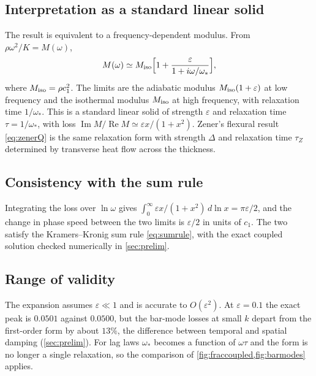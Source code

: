 \subsection{Interpretation as a standard linear solid}
The result is equivalent to a frequency-dependent modulus. From $\rho\omega^2/K=M(\omega)$,
\begin{equation}
M(\omega)\simeq M_{\rm iso}\Bigl[1+\frac{\varepsilon}{1+i\omega/\omega_*}\Bigr],
\end{equation}
where $M_{\rm iso}=\rho c_1^2$. The limits are the adiabatic modulus $M_{\rm iso}(1+\varepsilon)$ at low frequency and the isothermal modulus $M_{\rm iso}$ at high frequency, with relaxation time $1/\omega_*$. This is a standard linear solid of strength $\varepsilon$ and relaxation time $\tau=1/\omega_*$, with loss $\operatorname{Im}M/\operatorname{Re}M\simeq\varepsilon x/(1+x^2)$. Zener's flexural result \cref{eq:zenerQ} is the same relaxation form with strength $\Delta$ and relaxation time $\tau_Z$ determined by transverse heat flow across the thickness.

\subsection{Consistency with the sum rule}
Integrating the loss over $\ln\omega$ gives $\int_0^\infty\varepsilon x/(1+x^2)\,d\ln x=\pi\varepsilon/2$, and the change in phase speed between the two limits is $\varepsilon/2$ in units of $c_1$. The two satisfy the Kramers--Kronig sum rule \cref{eq:sumrule}, with the exact coupled solution checked numerically in \cref{sec:prelim}.

\subsection{Range of validity}
The expansion assumes $\varepsilon\ll1$ and is accurate to $O(\varepsilon^2)$. At $\varepsilon=0.1$ the exact peak is $0.0501$ against $0.0500$, but the bar-mode losses at small $k$ depart from the first-order form by about $13\%$, the difference between temporal and spatial damping (\cref{sec:prelim}). For lag laws $\omega_*$ becomes a function of $\omega\tau$ and the form is no longer a single relaxation, so the comparison of \cref{fig:fraccoupled,fig:barmodes} applies.
